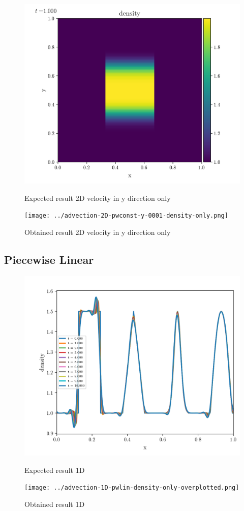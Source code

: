     \begin{figure}[htbp]
        \centering
        \includegraphics[width=.7\textwidth]{./figures/advection-2D-pwconst-y-0001-density-only.png}%
        \caption{Expected result 2D velocity in y direction only}
        \texttt{[image: ../advection-2D-pwconst-y-0001-density-only.png]}%
        \caption{Obtained result 2D velocity in y direction only}
    \end{figure}






\clearpage
\subsection{Piecewise Linear}


    \begin{figure}[htbp]
        \centering
        \includegraphics[width=.7\textwidth]{./figures/advection-1D-pwlin-density-only-overplotted.png}%
        \caption{Expected result 1D}
        \texttt{[image: ../advection-1D-pwlin-density-only-overplotted.png]}%
        \caption{Obtained result 1D}
    \end{figure}

